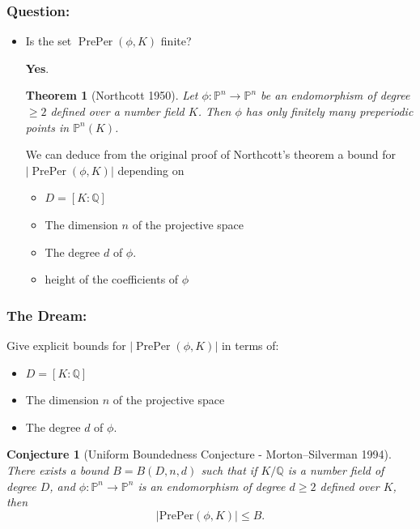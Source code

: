 \documentclass{beamer}
\def\PP{{\mathbb P}}
\def\QQ{{\mathbb Q}}
\DeclareMathOperator{\PrePer}{PrePer}
\theoremstyle{thmstyle}
\newtheorem*{mythm}{Theorem}
\theoremstyle{mystyle}
\newtheorem*{conjecture}{Conjecture}
\theoremstyle{qstnstyle}
\begin{document}
\begin{frame}
\frametitle{Question:}
\begin{itemize}
\item Is the set $\PrePer(\phi,K)$ finite? 

\pause \textbf{Yes}. 
\vspace{6mm}\pause

\begin{mythm}[Northcott 1950]
Let $\phi : \PP^n \to \PP^n$ be an endomorphism of degree $\geq{2}$
defined over a number field $K$. Then $\phi$ has
only finitely many preperiodic points in $\PP^n(K)$.
\end{mythm}

\vspace{6mm} \pause
We can deduce from the original proof of Northcott's theorem  a bound for $|\PrePer(\phi,K)|$ depending on
\begin{itemize}
\item  $D=[K: \QQ]$ 

\item The dimension $n$ of the projective space  

\item The degree $d$ of $\phi$.

\item height of the coefficients of $\phi$
\end{itemize}
\end{itemize}
\end{frame}

\begin{frame}
\frametitle{The Dream:}
Give explicit bounds for $|\PrePer(\phi,K)|$ in terms of:\pause
\begin{itemize}

\item  $D=[K: \QQ]$ 

\item The dimension $n$ of the projective space 

\item The degree $d$ of $\phi$.
\end{itemize}

\pause

\begin{conjecture}[Uniform Boundedness Conjecture - Morton--Silverman
  1994]
There exists a bound $B = B(D,n,d)$ such that if $K/\mathbb{Q}$ is a number field of degree $D$, and $\phi:\mathbb{P}^n\rightarrow\mathbb{P}^n$ is an endomorphism of degree $d\geq{2}$ defined over $K$, then 
$$|\text{PrePer}(\phi,K)| \leq B.$$
\end{conjecture}
\end{frame}
\end{document}

